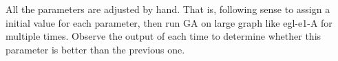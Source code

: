 \documentclass[journal]{IEEEtran}
\begin{document}
	All the parameters are adjusted by hand. That is, following sense to assign a initial value for each parameter, then run GA on large graph like egl-e1-A for multiple times. Observe the output of each time to determine whether this parameter is better than the previous one.

	
	
	
	
	
	
\end{document}
